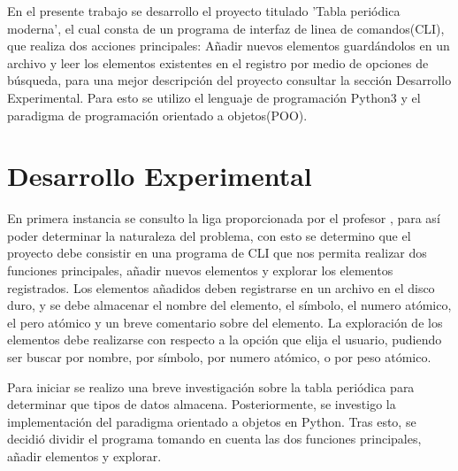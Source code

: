 \documentclass[conference]{IEEEtran}
\begin{document}
En el presente trabajo se desarrollo el proyecto titulado 'Tabla periódica moderna', el cual consta de un programa de interfaz de linea de comandos(CLI), que realiza dos acciones principales: Añadir nuevos elementos guardándolos en un archivo y leer los elementos existentes en el registro por medio de opciones de búsqueda, para una mejor descripción del proyecto consultar la sección Desarrollo Experimental. Para esto se utilizo el lenguaje de programación Python3 y el paradigma de programación orientado a objetos(POO).
 
\section{Desarrollo Experimental}

En primera instancia se consulto la liga proporcionada por el profesor \cite{MTP}, para así poder determinar la naturaleza del problema, con esto se determino que el proyecto debe consistir en una programa de CLI que nos permita realizar dos funciones principales, añadir nuevos elementos y explorar los elementos registrados. Los elementos añadidos deben registrarse en un archivo en el disco duro, y se debe almacenar el nombre del elemento, el símbolo, el numero atómico, el pero atómico y un breve comentario sobre del elemento. La exploración de los elementos debe realizarse con respecto a la opción que elija el usuario, pudiendo ser buscar por nombre, por símbolo, por numero atómico, o por peso atómico.\par

Para iniciar se realizo una breve investigación sobre la tabla periódica para determinar que tipos de datos almacena\cite{NGE}. Posteriormente, se investigo la implementación del paradigma orientado a objetos en Python\cite{gitPOO}\cite{IP}. Tras esto, se decidió dividir el programa tomando en cuenta las dos funciones principales, añadir elementos y explorar.
\end{document}
